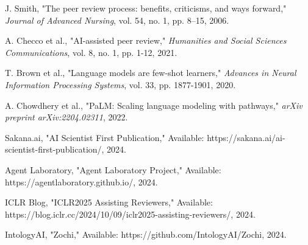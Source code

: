 \documentclass[conference]{IEEEtran}
\begin{document}
\begin{thebibliography}{00}
 J. Smith, "The peer review process: benefits, criticisms, and ways forward," \textit{Journal of Advanced Nursing}, vol. 54, no. 1, pp. 8–15, 2006.

 A. Checco et al., "AI-assisted peer review," \textit{Humanities and Social Sciences Communications}, vol. 8, no. 1, pp. 1-12, 2021.

 T. Brown et al., "Language models are few-shot learners," \textit{Advances in Neural Information Processing Systems}, vol. 33, pp. 1877-1901, 2020.

 A. Chowdhery et al., "PaLM: Scaling language modeling with pathways," \textit{arXiv preprint arXiv:2204.02311}, 2022.

 Sakana.ai, "AI Scientist First Publication," Available: https://sakana.ai/ai-scientist-first-publication/, 2024.

 Agent Laboratory, "Agent Laboratory Project," Available: https://agentlaboratory.github.io/, 2024.

 ICLR Blog, "ICLR2025 Assisting Reviewers," Available: https://blog.iclr.cc/2024/10/09/iclr2025-assisting-reviewers/, 2024.

 IntologyAI, "Zochi," Available: https://github.com/IntologyAI/Zochi, 2024.
\end{thebibliography}
\end{document}
